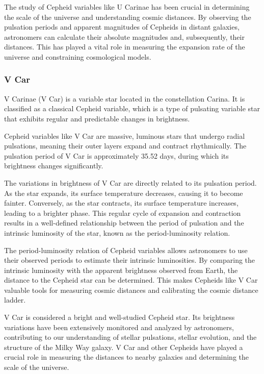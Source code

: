 The study of Cepheid variables like U Carinae has been crucial in determining the scale of the universe and understanding cosmic distances. By observing the pulsation periods and apparent magnitudes of Cepheids in distant galaxies, astronomers can calculate their absolute magnitudes and, subsequently, their distances. This has played a vital role in measuring the expansion rate of the universe and constraining cosmological models.

\subsubsection*{ V Car }
V Carinae (V Car) is a variable star located in the constellation Carina. It is classified as a classical Cepheid variable, which is a type of pulsating variable star that exhibits regular and predictable changes in brightness.

Cepheid variables like V Car are massive, luminous stars that undergo radial pulsations, meaning their outer layers expand and contract rhythmically. The pulsation period of V Car is approximately 35.52 days, during which its brightness changes significantly.

The variations in brightness of V Car are directly related to its pulsation period. As the star expands, its surface temperature decreases, causing it to become fainter. Conversely, as the star contracts, its surface temperature increases, leading to a brighter phase. This regular cycle of expansion and contraction results in a well-defined relationship between the period of pulsation and the intrinsic luminosity of the star, known as the period-luminosity relation.

The period-luminosity relation of Cepheid variables allows astronomers to use their observed periods to estimate their intrinsic luminosities. By comparing the intrinsic luminosity with the apparent brightness observed from Earth, the distance to the Cepheid star can be determined. This makes Cepheids like V Car valuable tools for measuring cosmic distances and calibrating the cosmic distance ladder.

V Car is considered a bright and well-studied Cepheid star. Its brightness variations have been extensively monitored and analyzed by astronomers, contributing to our understanding of stellar pulsations, stellar evolution, and the structure of the Milky Way galaxy. V Car and other Cepheids have played a crucial role in measuring the distances to nearby galaxies and determining the scale of the universe.

